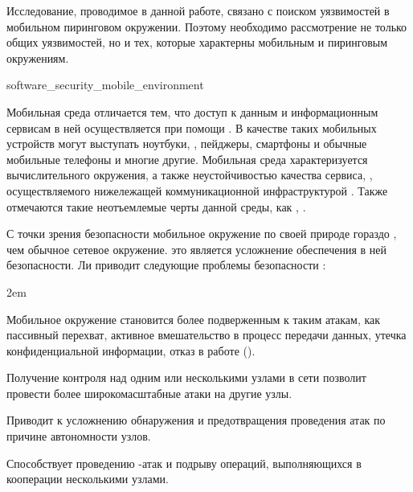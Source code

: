 %
Исследование, проводимое в данной работе, связано с поиском уязвимостей в мобильном пиринговом окружении. 
%
Поэтому необходимо рассмотрение не только общих уязвимостей, но и тех, которые характерны мобильным и пиринговым окружениям. 

	{software_security_mobile_environment}

%
Мобильная среда отличается тем, что доступ к данным и информационным сервисам в ней осуществляется при помощи  . 
%
В качестве таких мобильных устройств могут выступать ноутбуки, , пейджеры, смартфоны и обычные мобильные телефоны и многие другие.
%
Мобильная среда характеризуется  вычислительного окружения, а также неустойчивостью качества сервиса, , осуществляемого нижележащей коммуникационной инфраструктурой 
. 
%
Также отмечаются такие неотъемлемые черты данной среды, как ,  . 

%
С точки зрения безопасности мобильное окружение по своей природе гораздо , чем обычное сетевое окружение. 
%
 это является усложнение обеспечения в ней безопасности. 
%
Ли приводит следующие проблемы безопасности : 
\begin{description}
	\leftskip2em%
	\setlength{\itemsep}{0pt}%
	\setlength{\parsep}{0pt}%

	\item[Отсутствие границ безопасности.] Мобильное окружение становится более подверженным к таким атакам, как пассивный перехват, активное вмешательство в процесс передачи данных, утечка конфиденциальной информации, отказ в работе ().

	\item[Угроза со стороны скомпрометированных узлов.] Получение контроля над одним или несколькими узлами в сети позволит провести более широкомасштабные атаки на другие узлы. 

	\item[Отсутствие централизованного средства управления.] Приводит к усложнению обнаружения и предотвращения проведения атак по причине автономности узлов.

	\item[Ограниченное электропитание.] Способствует проведению -атак и подрыву операций, выполняющихся в кооперации несколькими узлами. 
\end{description}

